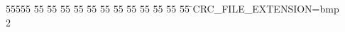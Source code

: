 %
%
\begin{tabbing}
55555 \= 55 \= 55 \= 55 \= 55 \= 55 \= 55 \= 55 \= 55 \= 55 \= 55 \= 55 \= 55 \= \>CRC\_FILE\_EXTENSION=bmp\\[0pt]
2\>\end{tabbing}
